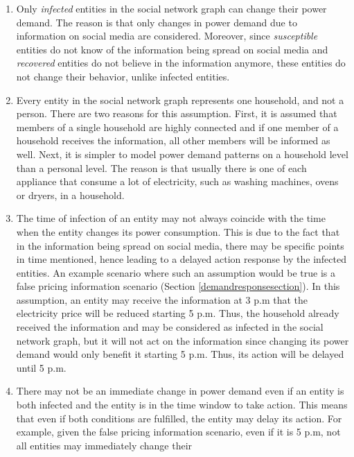 \begin{enumerate}
    \item Only \textit{infected} entities in 
    the social network graph can change their power demand. The reason is 
    that only changes in power demand due to information on social media
    are considered. Moreover, since \textit{susceptible} entities
    do not know of the information being spread on social media and 
    \textit{recovered} entities do not believe in the information anymore,
    these entities do not change their behavior, 
    unlike infected entities.
    \item Every entity in the social network graph 
    represents one household, and not a person. There are 
    two reasons for this assumption. First, it is assumed that 
    members of a single household are highly connected and if one 
    member of a household receives the information, all other members
    will be informed as well. Next, it is simpler to model power demand
    patterns on a household level than a personal level. The reason
    is that usually
    there is one of each appliance that consume a lot of electricity, 
    such as washing machines, ovens or dryers, in a household.
    \item The time of infection of an entity may not
    always coincide with the time when the entity changes its 
    power consumption. This is due to the fact that in the information
    being spread on social media, there may be specific points in time
    mentioned, hence leading to a delayed action response by the
    infected entities. An example scenario where such an assumption
    would be true is a false pricing information scenario 
    (Section \ref{demandresponsesection}).
    In this assumption, an entity may receive the information 
    at 3 p.m that the electricity price will be reduced 
    starting 5 p.m. Thus, the household already received the
    information and may be considered as infected in the social network
    graph, but it will not act on the information since changing
    its power demand would only benefit it starting 5 p.m. Thus, its 
    action will be delayed until 5 p.m. 
    \item There may not be an immediate change 
    in power demand even if an entity is both infected and the entity 
    is in the time window to take action. This means that even if
    both conditions are fulfilled, the entity may delay its action. 
    For example, given the false pricing information scenario, 
    even if it is 5 p.m, not all entities may immediately change their 

\end{enumerate}
